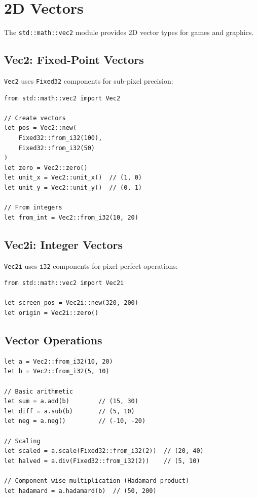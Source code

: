 \section{2D Vectors}
\label{sec:math-vec2}

The \texttt{std::math::vec2} module provides 2D vector types for games and graphics.

\subsection{Vec2: Fixed-Point Vectors}

\texttt{Vec2} uses \texttt{Fixed32} components for sub-pixel precision:

\begin{lstlisting}
from std::math::vec2 import Vec2

// Create vectors
let pos = Vec2::new(
    Fixed32::from_i32(100),
    Fixed32::from_i32(50)
)
let zero = Vec2::zero()
let unit_x = Vec2::unit_x()  // (1, 0)
let unit_y = Vec2::unit_y()  // (0, 1)

// From integers
let from_int = Vec2::from_i32(10, 20)
\end{lstlisting}

\subsection{Vec2i: Integer Vectors}

\texttt{Vec2i} uses \texttt{i32} components for pixel-perfect operations:

\begin{lstlisting}
from std::math::vec2 import Vec2i

let screen_pos = Vec2i::new(320, 200)
let origin = Vec2i::zero()
\end{lstlisting}

\subsection{Vector Operations}

\begin{lstlisting}
let a = Vec2::from_i32(10, 20)
let b = Vec2::from_i32(5, 10)

// Basic arithmetic
let sum = a.add(b)        // (15, 30)
let diff = a.sub(b)       // (5, 10)
let neg = a.neg()         // (-10, -20)

// Scaling
let scaled = a.scale(Fixed32::from_i32(2))  // (20, 40)
let halved = a.div(Fixed32::from_i32(2))    // (5, 10)

// Component-wise multiplication (Hadamard product)
let hadamard = a.hadamard(b)  // (50, 200)
\end{lstlisting}

